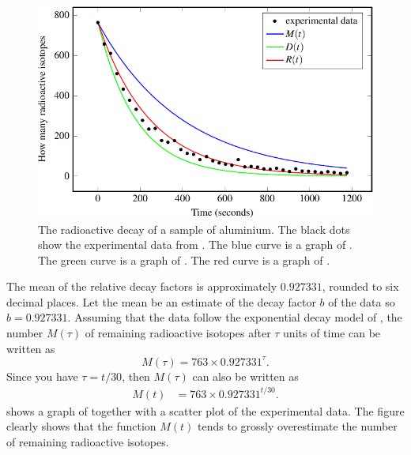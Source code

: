 \documentclass[a4paper,oneside,12pt]{article}
\begin{document}
\begin{problem}
{\begin{solution}
\begin{figure}[!htbp]
\centering
\includegraphics[scale=1.1]{image/11/aluminium.pdf}
\caption{%
  The radioactive decay of a sample of aluminium.  The black dots show
  the experimental data from .
  The blue curve is a graph of
  .  The green curve is a
  graph of .  The red curve
  is a graph of .
}
\label{fig:aluminium_radioactive_decay}
\end{figure}

The mean of the relative decay factors is approximately $0.927331$,
rounded to six decimal places.  Let the mean be an estimate of the
decay factor $b$ of the data so $b = 0.927331$.  Assuming that the
data follow the exponential decay model of
, the number $M(\tau)$ of remaining
radioactive isotopes after $\tau$ units of time can be written as
\[
M(\tau)
=
763 \times 0.927331^{\tau}.
\]
Since you have $\tau = t / 30$, then $M(\tau)$ can also be written as
\begin{equation}
\label{eqn:aluminium_mean_decay_factor}
\begin{aligned}
M(t)
&=
763 \times 0.927331^{t / 30}.
\end{aligned}
\end{equation}
 shows a graph of
 together with a scatter
plot of the experimental data.  The figure clearly shows that the
function $M(t)$ tends to grossly overestimate the number of remaining
radioactive isotopes.


\end{solution}}
\end{problem}
\end{document}
